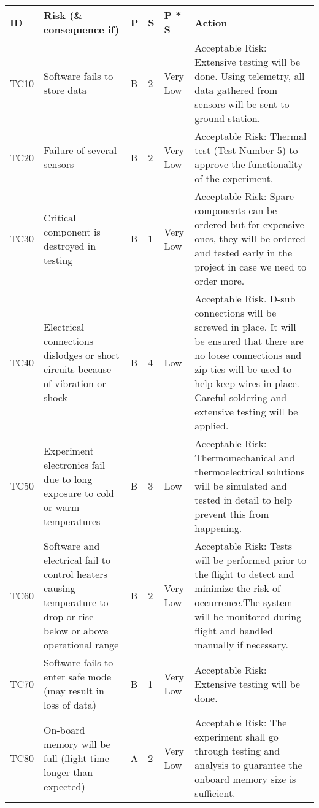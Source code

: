 


\begin{longtable}{|m{}| m{} |m{} |m{}|m{}| m{}|}

\hline
\textbf{ID} & \textbf{Risk (\& consequence if)} & \textbf{P} & \textbf{S} & \textbf{P * S} & \textbf{Action} \\ \hline
TC10 & Software fails to store data & B & 2 & \cellcolor[HTML]{34FF34}Very Low & Acceptable Risk: Extensive testing will be done. Using telemetry, all data gathered from sensors will be sent to ground station. \\ \hline
TC20 & Failure of several sensors & B & 2 & \cellcolor[HTML]{34FF34}Very Low & Acceptable Risk: Thermal test (Test Number 5) to approve the functionality of the experiment. \\ \hline
TC30 & Critical component is destroyed in testing & B & 1 & \cellcolor[HTML]{34FF34}Very Low & Acceptable Risk: Spare components can be ordered but for expensive ones, they will be ordered and tested early in the project in case we need to order more. \\ \hline
TC40 & Electrical connections dislodges or short circuits because of vibration or shock & B & 4 & \cellcolor[HTML]{FCFF2F}Low & Acceptable Risk. D-sub connections will be screwed in place. It will be ensured that there are no loose connections and zip ties will be used to help keep wires in place. Careful soldering and extensive testing will be applied. \\ \hline
TC50 & Experiment electronics fail due to long exposure to cold or warm temperatures & B & 3 & \cellcolor[HTML]{FCFF2F}Low & Acceptable Risk: Thermomechanical and thermoelectrical solutions will be simulated and tested in detail to help prevent this from happening. \\ \hline
TC60 & Software and electrical fail to control heaters causing temperature to drop or rise below or above operational range & B & 2 & \cellcolor[HTML]{34FF34}Very Low & Acceptable Risk: Tests will be performed prior to the flight to detect and minimize the risk of occurrence.The system will be monitored during flight and handled manually if necessary. \\ \hline
TC70 & Software fails to enter safe mode (may result in loss of data) & B & 1 & \cellcolor[HTML]{34FF34}Very Low & Acceptable Risk: Extensive testing will be done. \\ \hline
TC80 & On-board memory will be full (flight time longer than expected) & A & 2 & \cellcolor[HTML]{34FF34}Very Low & Acceptable Risk: The experiment shall go through testing and analysis to guarantee the onboard memory size is sufficient.\\ \hline

\end{longtable}

